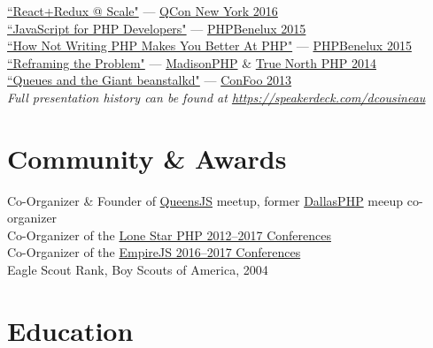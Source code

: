 \documentclass{resume}
\begin{document}
\begin{spacing}{1.25}
\href{https://speakerdeck.com/dcousineau/react-plus-redux-at-scale}{``React+Redux @ Scale"} --- \href{https://qconnewyork.com/ny2017/presentation/reactredux-scale-talk}{QCon New York 2016}\\
\href{https://speakerdeck.com/dcousineau/javascript-for-php-developers}{``JavaScript for PHP Developers"} --- \href{https://conference.phpbenelux.eu/2015/}{PHPBenelux 2015}\\
\href{https://speakerdeck.com/dcousineau/how-not-writing-php-makes-you-better-at-php}{``How Not Writing PHP Makes You Better At PHP"} --- \href{https://conference.phpbenelux.eu/2015/}{PHPBenelux 2015}\\
\href{https://speakerdeck.com/dcousineau/reframing-the-problem-truenorthphp-2014}{``Reframing the Problem"} --- \href{http://2014.madisonphpconference.com/schedule/view/19/reframing-the-problem-daniel-cousineau}{MadisonPHP} \& \href{http://truenorthphp.ca/}{True North PHP 2014}\\
\href{https://speakerdeck.com/dcousineau/queues-and-the-giant-beanstalkd}{``Queues and the Giant beanstalkd"} --- \href{http://confoo.ca/}{ConFoo 2013}\\
\emph{Full presentation history can be found at \href{https://speakerdeck.com/dcousineau}{https://speakerdeck.com/dcousineau}}
\end{spacing}

\section{Community \& Awards}

Co-Organizer \& Founder of \href{http://queensjs.com/}{QueensJS} meetup, former \href{http://www.meetup.com/dallasphp/}{DallasPHP} meeup co-organizer
\\
Co-Organizer of the \href{http://lonestarphp.com/}{Lone Star PHP 2012--2017 Conferences}
\\
Co-Organizer of the \href{http://empirejs.org/}{EmpireJS 2016--2017 Conferences}
\\
Eagle Scout Rank, Boy Scouts of America, 2004

\section{Education}

\end{document}
